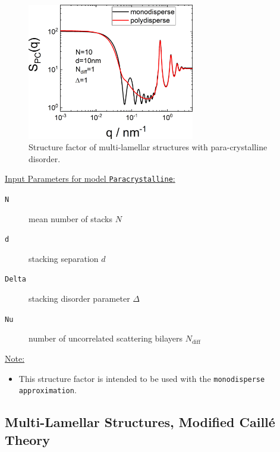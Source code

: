 \begin{figure}[htb]
\begin{center}
\includegraphics[width=0.65\textwidth]{../images/structure_factor/Lamellar/PCLamellar.png}
\end{center}
\caption{Structure factor of multi-lamellar structures with para-crystalline disorder. }
\label{fig:PCLamellar}
\end{figure}

\vspace{5mm}

\noindent
\underline{Input Parameters for model \texttt{Paracrystalline}:}
\begin{description}
\item[\texttt{N}] mean number of stacks $N$
\item[\texttt{d}] stacking separation $d$
\item[\texttt{Delta}]  stacking disorder parameter $\Delta$
\item[\texttt{Nu}]   number of uncorrelated scattering bilayers $N_\text{diff}$
\end{description}

\noindent\underline{Note:}
\begin{itemize}
\item This structure factor is intended to be used with the \texttt{monodisperse approximation}.
\end{itemize}

\clearpage

\subsection{Multi-Lamellar Structures, Modified Caill\'e Theory} ~\\

